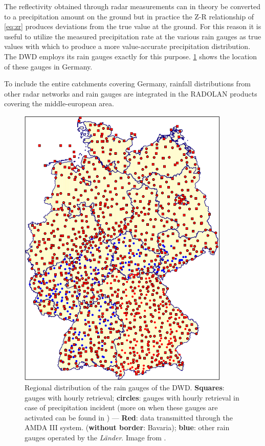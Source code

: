 The reflectivity obtained through radar measurements can in theory be converted to a precipitation amount on the ground but in practice the Z-R relationship of \cref{eq:zr} produces deviations from the true value at the ground. For this reason it is useful to utilize the measured precipitation rate at the various rain gauges as true values with which to produce a more value-accurate precipitation distribution. The DWD employs its rain gauges exactly for this purpose. \cref{fig:dwdgauges} shows the location of these gauges in Germany. 

To include the entire catchments covering Germany, rainfall distributions from other radar networks and rain gauges are integrated in the RADOLAN products covering the middle-european area.

\begin{figure}[h!]
    \centering
    \includegraphics[width=0.9\textwidth]{DWDWeatherStations.png}
    \caption{Regional distribution of the rain gauges of the DWD. \textbf{Squares}: gauges with hourly retrieval; \textbf{circles}: gauges with hourly retrieval in case of precipitation incident (more on when these gauges are activated can be found in \citet{Weigl2004ProjektOmbrometer}) — \textbf{\color{red} Red}: data transmitted through the AMDA III system. (\textbf{without border}: Bavaria); \textbf{\color{blue} blue}: other rain gauges operated by the \textit{Länder}. Image from \citet{Weigl2004ProjektOmbrometer}.}
    \label{fig:dwdgauges}
\end{figure}

